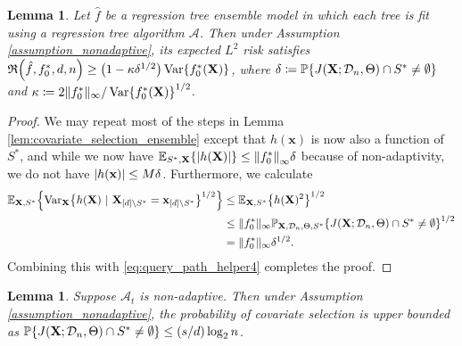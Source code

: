 \documentclass[11pt]{article}
\newtheorem{lemma}[theorem]{Lemma}
\newcommand{\bx}{\mathbf{x}}
\newcommand{\bX}{\mathbf{X}}
\DeclarePairedDelimiter{\braces}{\lbrace}{\rbrace}
\DeclarePairedDelimiter{\paren}{(}{)}
\DeclarePairedDelimiter{\abs}{|}{|}
\DeclarePairedDelimiter{\norm}{\|}{\|}
\renewcommand{\P}{\mathbb{P}}
\newcommand{\E}{\mathbb{E}}
\newcommand{\Var}{\operatorname{Var}}
\newcommand{\sparsity}{s}
\newcommand{\nfeats}{d}
\newcommand{\nsamples}{n}
\newcommand{\coordindices}{[\nfeats]}
\newcommand{\data}[1][n]{\mathcal{D}_{#1}}
\newcommand{\suppset}{S^*}
\newcommand{\alg}{\mathcal{A}}
\newcommand{\objective}{\mathfrak{R}}
\newcommand{\ybound}{M}
\begin{document}
\begin{lemma}
\label{lem:covariate_selection_ensemble_nonadaptive}
    Let $\hat f$ be a regression tree ensemble model in which each tree is fit using a regression tree algorithm $\alg$.
    Then under Assumption \ref{assumption_nonadaptive}, its expected $L^2$ risk satisfies $\objective\paren*{\hat f, f^*_0,\nfeats,\nsamples} \geq \paren*{1-\kappa\delta^{1/2}}\Var\braces*{f^*_0(\bX)}$, where $\delta \coloneqq \P\braces*{J(\bX;\data,\Theta)\cap \suppset \neq \emptyset }$ and $\kappa \coloneqq 2\|f_0^*\|_{\infty}/\Var\braces*{f^*_0(\bX)}^{1/2}$.
\end{lemma}

\begin{proof}
    We may repeat most of the steps in Lemma \ref{lem:covariate_selection_ensemble} except that $h(\bx)$ is now also a function of $\suppset$, and while we now have $\E_{\suppset,\bX}\braces*{\abs*{h(\bX)}} \leq \norm*{f_0^*}_\infty \delta$ because of non-adaptivity, we do not have $\abs*{h(\bx)} \leq M\delta$.
    Furthermore, we calculate
    \begin{equation}
        \begin{split}
            \E_{\bX,\suppset}\braces*{\Var_{\bX}\braces*{h(\bX)~|~\bX_{\coordindices\backslash\suppset}=\bx_{\coordindices\backslash\suppset}}^{1/2}} & \leq \E_{\bX,\suppset}\braces*{h(\bX)^2}^{1/2} \\
            & \leq \|f_0^*\|_{\infty} \P_{\bX,\data,\Theta,\suppset}\braces*{J(\bX;\data,\Theta)\cap \suppset \neq \emptyset}^{1/2} \\
            & = \|f_0^*\|_{\infty}\delta^{1/2}.
        \end{split}
    \end{equation}
    Combining this with \eqref{eq:query_path_helper4} completes the proof.
\end{proof}

\begin{lemma}
    \label{lem:na_tree_query_path}
    Suppose $\alg_t$ is non-adaptive.
    Then under Assumption \ref{assumption_nonadaptive}, the probability of covariate selection is upper bounded as
    $\P\braces*{J(\bX;\data,\Theta)\cap \suppset \neq \emptyset } \leq (\sparsity/\nfeats)\log_2\nsamples$.
\end{lemma}
\end{document}
